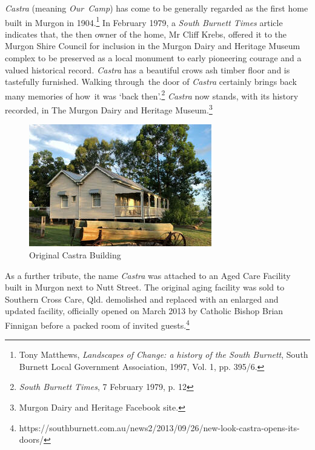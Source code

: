 \emph{Castra} (meaning \emph{Our~Camp}) has come to be generally regarded as the first home built in Murgon in 1904.\footnote{Tony Matthews, \emph{Landscapes of Change: a history of the South Burnett}, South Burnett Local Government Association, 1997, Vol. 1, pp. 395/6.} In February 1979, a \emph{South Burnett Times} article indicates that, the then owner of the home, Mr Cliff Krebs, offered it to the Murgon Shire Council for inclusion in the Murgon Dairy and Heritage Museum complex to be preserved as a local monument to early pioneering courage and a valued historical record\emph{. Castra} has a beautiful crows ash timber floor and is tastefully furnished. Walking through~the door of \emph{Castra} certainly brings back many memories of how~it was `back then'.\footnote{\emph{South Burnett Times}, 7 February 1979, p. 12} \emph{Castra} now stands, with its history recorded, in The Murgon Dairy and Heritage Museum.\footnote{Murgon Dairy and Heritage Facebook site.}








\begin{figure}
\begin{center}
\includegraphics[width=1.\linewidth,center]{../images/castraOld.png}
\caption{Original Castra Building}
\end{center}
\end{figure}




As a further tribute, the name \emph{Castra} was attached to an Aged Care Facility built in Murgon next to Nutt Street. The original aging facility was sold to Southern Cross Care, Qld. demolished and replaced with an enlarged and updated facility, officially opened on March 2013 by Catholic Bishop Brian Finnigan before a packed room of invited guests.\footnote{https://southburnett.com.au/news2/2013/09/26/new-look-castra-opens-its-doors/}


